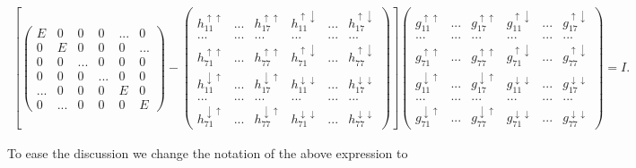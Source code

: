 \documentclass[10pt,prb,showpacs,amssymb,floatfix]{revtex4-1}
\newcommand{\dna}{\downarrow}
\newcommand{\upa}{\uparrow}
\begin{document}
\begin{align}
 \left[ \left(\begin{array}{cccccc} 
E    &  0 & 0 &  0 & ... &  0  \\
0    &  E & 0 &  0 & 0 &  ...  \\
0    & 0  & ... &  0 & 0 &  0  \\
0    & 0  & 0 &  ... & 0 &  0  \\
...    & 0  & 0 &  0 & E &  0  \\
0    & ...  & 0 &  0 & 0 &  E 
\end{array}\right) -
 \left(\begin{array}{cccccc} 
h^{\upa\upa}_{11}   &  ... & h^{\upa\upa}_{17} & h^{\upa\dna}_{11}  & ... & h^{\upa\dna}_{17}   \\
... &  ... & ...  & ... & ... & ... \\
 h^{\upa\upa}_{71} & ... &  h^{\upa\upa}_{77} &  h^{\upa\dna}_{71} & ... & h^{\upa\dna}_{77}   \\
  h^{\dna\upa}_{11} & ... & h^{\dna\upa}_{17} & h^{\dna\dna}_{11} & ... & h^{\dna\dna}_{17}  \\
... &  ... & ...  & ... & ... & ...  \\
h^{\dna\upa}_{71} & ... &  h^{\dna\upa}_{77} &  h^{\dna\dna}_{71} & ... & h^{\dna\dna}_{77}  
\end{array}\right) \right] 
 \left(\begin{array}{ccccccc} 
g^{\upa\upa}_{11}   &  ... & g^{\upa\upa}_{17} & g^{\upa\dna}_{11}  & ... & g^{\upa\dna}_{17}   \\
... &  ... & ...  & ... & ... & ... \\
 g^{\upa\upa}_{71} & ... &  g^{\upa\upa}_{77} &  g^{\upa\dna}_{71} & ... & g^{\upa\dna}_{77}   \\
  g^{\dna\upa}_{11} & ... & g^{\dna\upa}_{17} & g^{\dna\dna}_{11} & ... & g^{\dna\dna}_{17}  \\
... &  ... & ...  & ... & ... & ...  \\
g^{\dna\upa}_{71} & ... &  g^{\dna\upa}_{77} &  g^{\dna\dna}_{71} & ... & g^{\dna\dna}_{77}  \end{array}\right) =  
I.
\label{mat005}
\end{align}

To ease the discussion we change the notation of the above expression to
\end{document}
